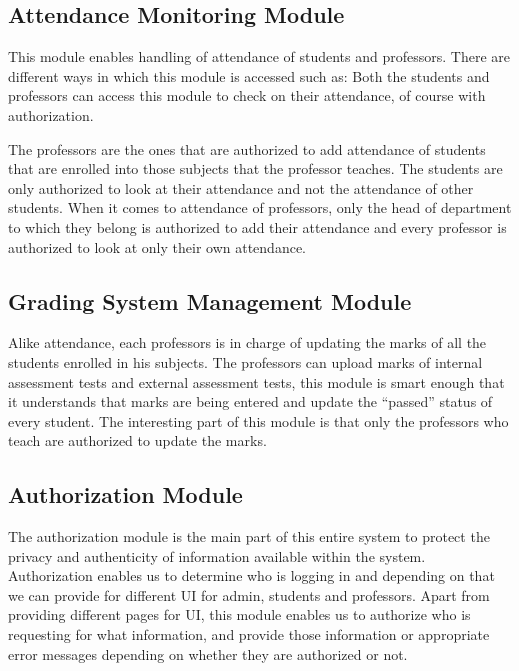 \subsection{Attendance Monitoring Module}
This module enables handling of attendance of students and professors. There are
different ways in which this module is accessed such as: Both the students and
professors can access this module to check on their attendance, of course with
authorization.

The professors are the ones that are authorized to add attendance of students
that are enrolled into those subjects that the professor teaches.  The students
are only authorized to look at their attendance and not the attendance of other
students. When it comes to attendance of professors, only the head of department
to which they belong is authorized to add their attendance and every professor
is authorized to look at only their own attendance.

\subsection{Grading System Management Module}
Alike attendance, each professors is in charge of updating the marks of all the
students enrolled in his subjects. The professors can upload marks of internal
assessment tests and external assessment tests, this module is smart enough
that it understands that marks are being entered and update the “passed” status
of every student. The interesting part of this module is that only the
professors who teach are authorized to update the marks.

\subsection{Authorization Module}

The authorization module is the main part of this entire system to protect the
privacy and authenticity of information available within the system.
Authorization enables us to determine who is logging in and depending on that we
can provide for different UI for admin, students and professors. Apart from
providing different pages for UI, this module enables us to authorize who is
requesting for what information, and provide those information or appropriate
error messages depending on whether they are authorized or not.

